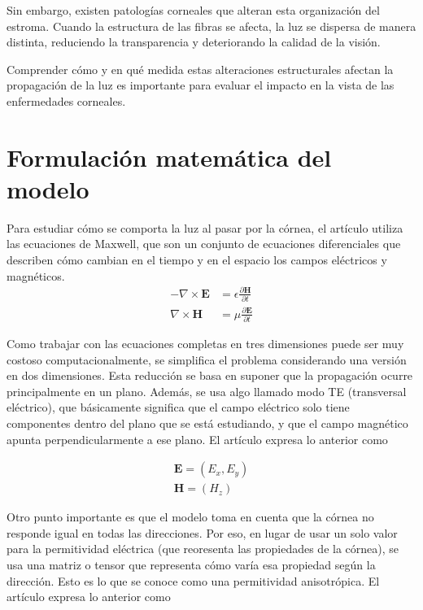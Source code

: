 \documentclass[10pt,a4paper]{article}
\begin{document}
Sin embargo, existen patologías corneales que alteran esta organización del estroma. Cuando la estructura de las fibras se afecta, la luz se dispersa de manera distinta, reduciendo la transparencia y deteriorando la calidad de la visión.

Comprender cómo y en qué medida estas alteraciones estructurales afectan la propagación de la luz es importante para evaluar el impacto en la vista de las enfermedades corneales.

\newpage

\section{Formulación matemática del modelo}

Para estudiar cómo se comporta la luz al pasar por la córnea, el artículo utiliza las ecuaciones de Maxwell, que son un conjunto de ecuaciones diferenciales que describen cómo cambian en el tiempo y en el espacio los campos eléctricos y magnéticos. 
\[
\begin{aligned}
- \nabla \times \mathbf{E} &= \epsilon \frac{\partial \mathbf{H}}{\partial t} \\
\nabla \times \mathbf{H} &= \mu \frac{\partial \mathbf{E}}{\partial t}
\end{aligned}
\]

Como trabajar con las ecuaciones completas en tres dimensiones puede ser muy costoso computacionalmente, se simplifica el problema considerando una versión en dos dimensiones. Esta reducción se basa en suponer que la propagación ocurre principalmente en un plano. Además, se usa algo llamado modo TE (transversal eléctrico), que básicamente significa que el campo eléctrico solo tiene componentes dentro del plano que se está estudiando, y que el campo magnético apunta perpendicularmente a ese plano. El artículo expresa lo anterior como 

\[
\begin{aligned}
\mathbf{E}=(E_x,E_y)\\
\mathbf{H}=(H_z)
\end{aligned}
\]

Otro punto importante es que el modelo toma en cuenta que la córnea no responde igual en todas las direcciones. Por eso, en lugar de usar un solo valor para la permitividad eléctrica (que reoresenta las propiedades de la córnea), se usa una matriz o tensor que representa cómo varía esa propiedad según la dirección. Esto es lo que se conoce como una permitividad anisotrópica. El artículo expresa lo anterior como 
\end{document}
